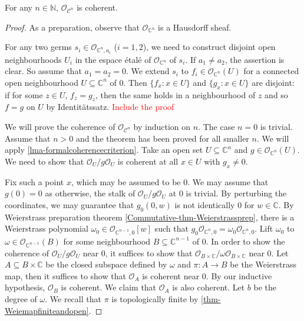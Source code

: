 \begin{lemma}[Oka]\label{lma-Okacoh}
    For any $n\in \mathbb{N}$, $\mathcal{O}_{\mathcal{C}^n}$ is coherent.
\end{lemma}
\begin{proof}
    As a preparation, observe that $\mathcal{O}_{\mathbb{C}^n}$ is a Hausdorff sheaf.
    
    For any two germs $s_i\in \mathcal{O}_{\mathbb{C}^n,a_i}$ ($i=1,2$), we need to construct disjoint open neighbourhoods $U_i$ in the espace étalé of $\mathcal{O}_{\mathbb{C}^n}$ of $s_i$. If $a_1\neq a_2$, the assertion is clear. So assume that $a_1=a_2=0$. We extend $s_i$ to $f_i\in \mathcal{O}_{\mathbb{C}^n}(U)$ for a connected open neighbourhood $U\subseteq \mathbb{C}^n$ of $0$. Then $\{f_x:x\in U\}$ and $\{g_x:x\in U\}$ are disjoint: if for some $z\in U$, $f_z=g_z$, then the same holds in a neighbourhood of $z$ and so $f=g$ on $U$ by Identitätssatz. \textcolor{red}{Include the proof}

    We will prove the coherence of $\mathcal{O}_{\mathcal{C}^n}$ by induction on $n$. The case $n=0$ is trivial. Assume that $n>0$ and the theorem has been proved for all smaller $n$. We will apply \cref{lma-formalcoherencecriterion}. Take an open set $U\subseteq \mathbb{C}^n$ and $g\in \mathcal{O}_{\mathbb{C}^n}(U)$. We need to show that $\mathcal{O}_U/g\mathcal{O}_U$ is coherent at all $x\in U$ with $g_x\neq 0$.

    Fix such a point $x$, which may be assumed to be $0$. We may assume that $g(0)=0$ as otherwise, the stalk of $\mathcal{O}_U/g\mathcal{O}_U$ at $0$ is trivial. By perturbing the coordinates, we may guarantee that $g_0(0,w)$ is not identically $0$ for $w\in \mathbb{C}$. By Weierstrass preparation theorem \cref{Commutative-thm-Weierstrassprep}, there is a Weierstrass polynomial $\omega_0\in \mathcal{O}_{\mathbb{C}^{n-1},0}[w]$ such that $g_0\mathcal{O}_{\mathbb{C}^n,0}=\omega_0\mathcal{O}_{\mathbb{C}^n,0}$. Lift $\omega_0$ to $\omega\in \mathcal{O}_{\mathbb{C}^{n-1}}(B)$ for some neighbourhood $B\subseteq \mathbb{C}^{n-1}$ of $0$. In order to show the coherence of $\mathcal{O}_U/g\mathcal{O}_U$ near $0$, it suffices to show that $\mathcal{O}_{B\times \mathbb{C}}/\omega \mathcal{O}_{B\times \mathbb{C}}$ near $0$. Let $A\subseteq B\times \mathbb{C}$ be the closed subspace defined by $\omega$ and $\pi:A\rightarrow B$ be the Weierstrass map, then it suffices to show that $\mathcal{O}_{A}$ is coherent near $0$. By our inductive hypothesis, $\mathcal{O}_B$ is coherent. We claim that $\mathcal{O}_A$ is also coherent. Let $b$ be the degree of $\omega$. We recall that $\pi$ is topologically finite by \cref{thm-Weiemapfiniteandopen}.


\end{proof}
